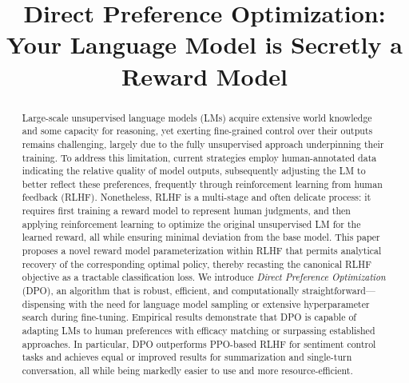 \title{Direct Preference Optimization: Your Language Model is Secretly a Reward Model}

\begin{abstract}
Large-scale unsupervised language models (LMs) acquire extensive world knowledge and some capacity for reasoning, yet exerting fine-grained control over their outputs remains challenging, largely due to the fully unsupervised approach underpinning their training. To address this limitation, current strategies employ human-annotated data indicating the relative quality of model outputs, subsequently adjusting the LM to better reflect these preferences, frequently through reinforcement learning from human feedback (RLHF). Nonetheless, RLHF is a multi-stage and often delicate process: it requires first training a reward model to represent human judgments, and then applying reinforcement learning to optimize the original unsupervised LM for the learned reward, all while ensuring minimal deviation from the base model. This paper proposes a novel reward model parameterization within RLHF that permits analytical recovery of the corresponding optimal policy, thereby recasting the canonical RLHF objective as a tractable classification loss. We introduce \textit{Direct Preference Optimization} (DPO), an algorithm that is robust, efficient, and computationally straightforward—dispensing with the need for language model sampling or extensive hyperparameter search during fine-tuning. Empirical results demonstrate that DPO is capable of adapting LMs to human preferences with efficacy matching or surpassing established approaches. In particular, DPO outperforms PPO-based RLHF for sentiment control tasks and achieves equal or improved results for summarization and single-turn conversation, all while being markedly easier to use and more resource-efficient.
\end{abstract}

